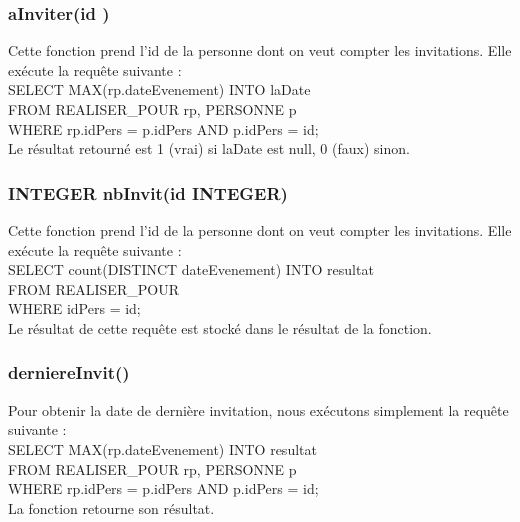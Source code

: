 \documentclass[a4paper,10pt]{report}
\begin{document}
\subsubsection{ aInviter(id )}

Cette fonction prend l'id de la personne dont on veut compter les invitations. Elle exécute la requête  suivante : \\

	SELECT MAX(rp.dateEvenement) INTO laDate\\
	\indent FROM REALISER\_POUR rp, PERSONNE p\\
	\indent WHERE rp.idPers = p.idPers AND p.idPers = id;\\
	
Le résultat retourné est 1 (vrai) si laDate est null, 0 (faux) sinon. 

\subsubsection{INTEGER nbInvit(id INTEGER)}

Cette fonction prend l'id de la personne dont on veut compter les invitations. Elle exécute la requête  suivante : \\

SELECT count(DISTINCT dateEvenement) INTO resultat\\
	\indent FROM REALISER\_POUR\\
	\indent WHERE idPers = id;\\
	
Le résultat de cette requête est stocké dans le résultat de la fonction.

\subsubsection{derniereInvit()}

Pour obtenir la date de dernière invitation, nous exécutons simplement la requête suivante :\\

	SELECT MAX(rp.dateEvenement) INTO resultat\\
	\indent FROM REALISER\_POUR rp, PERSONNE p\\
	\indent WHERE rp.idPers = p.idPers AND p.idPers = id;\\
	
La fonction retourne son résultat.
\end{document}
